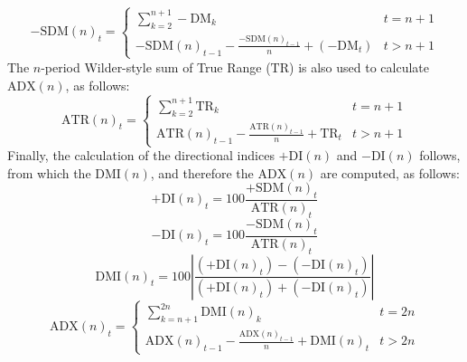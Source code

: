 \documentclass[stu,floatsintext]{apa7}
\begin{document}
\begin{enumerate}
\begin{equation}-\text{SDM}(n)_t=\begin{cases}\displaystyle\sum_{k=2}^{n+1}-\text{DM}_k& t=n+1\\
-\text{SDM}(n)_{t-1}-\displaystyle\frac{-\text{SDM}(n)_{t-1}}{n}+(-\text{DM}_t)& t>n+1\end{cases}\end{equation}
The $n$-period Wilder-style sum of True Range ($\text{TR}$) is also used to calculate $\text{ADX}(n)$, as follows:
\begin{equation}\text{ATR}(n)_t=\begin{cases}\displaystyle\sum_{k=2}^{n+1}\text{TR}_k& t=n+1\\
\text{ATR}(n)_{t-1}-\displaystyle\frac{\text{ATR}(n)_{t-1}}{n}+\text{TR}_t& t>n+1\end{cases}\end{equation}
Finally, the calculation of the directional indices $+\text{DI}(n)$ and $-\text{DI}(n)$ follows, from which the $\text{DMI}(n)$, and therefore the $\text{ADX}(n)$ are computed, as follows:
\begin{equation}+\text{DI}(n)_t=100\frac{+\text{SDM}(n)_t}{\text{ATR}(n)_t}\end{equation}
\begin{equation}-\text{DI}(n)_t=100\frac{-\text{SDM}(n)_t}{\text{ATR}(n)_t}\end{equation}
\begin{equation}\text{DMI}(n)_t=100\left|\frac{(+\text{DI}(n)_t)-(-\text{DI}(n)_t)}{(+\text{DI}(n)_t)+(-\text{DI}(n)_t)}\right|\end{equation}
\begin{equation}\text{ADX}(n)_t=\begin{cases}\displaystyle\sum_{k=n+1}^{2n}\text{DMI}(n)_k& t=2n\\
\text{ADX}(n)_{t-1}-\displaystyle\frac{\text{ADX}(n)_{t-1}}{n}+\text{DMI}(n)_t& t>2n\end{cases}\end{equation}

\end{enumerate}
\end{document}
